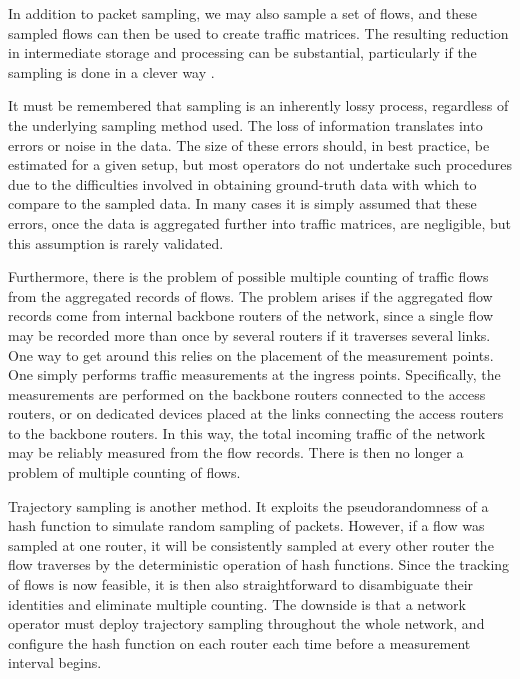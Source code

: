 In addition to packet sampling, we may also sample a set of flows, and
these sampled flows can then be used to create traffic matrices. The
resulting reduction in intermediate storage and processing can be
substantial, particularly if the sampling is done in a clever way
\cite{Duffield05Sampled,Duffield05Smart}.

It must be remembered that sampling is an inherently lossy process,
regardless of the underlying sampling method used.  The loss of
information translates into errors or noise in the data. The size of
these errors should, in best practice, be estimated for a given setup,
but most operators do not undertake such procedures due to the
difficulties involved in obtaining ground-truth data with which to
compare to the sampled data. In many cases it is simply assumed that
these errors, once the data is aggregated further into traffic
matrices, are negligible, but this assumption is rarely validated.

Furthermore, there is the problem of possible multiple counting of 
traffic flows from the aggregated records of flows. The problem 
arises if the aggregated flow records come from internal backbone
routers of the network, since a single flow may be recorded more than
once by several routers if it traverses several links. One way to
get around this relies on the placement of the measurement
points. One simply performs traffic measurements at the ingress points.
Specifically, the measurements are performed on the backbone routers 
connected to the access routers, or on dedicated devices placed at the 
links connecting the access routers to the backbone routers. 
In this way, the total incoming traffic of the network may be reliably
measured from the flow records. There is then no longer a problem of 
multiple counting of flows.

Trajectory sampling \cite{Duffield01Trajectory,Duffield04Unreliable} 
is another method. It exploits the pseudorandomness 
of a hash function to simulate random sampling of packets. However, if a flow 
was sampled at one router, it will be consistently sampled at every 
other router the flow traverses by the deterministic operation of hash 
functions. Since the tracking of flows is now feasible, it is then also 
straightforward to disambiguate their identities and eliminate multiple
counting. The downside is that a network operator must deploy 
trajectory sampling throughout the whole network, and configure
the hash function on each router each time before a measurement interval
begins.

